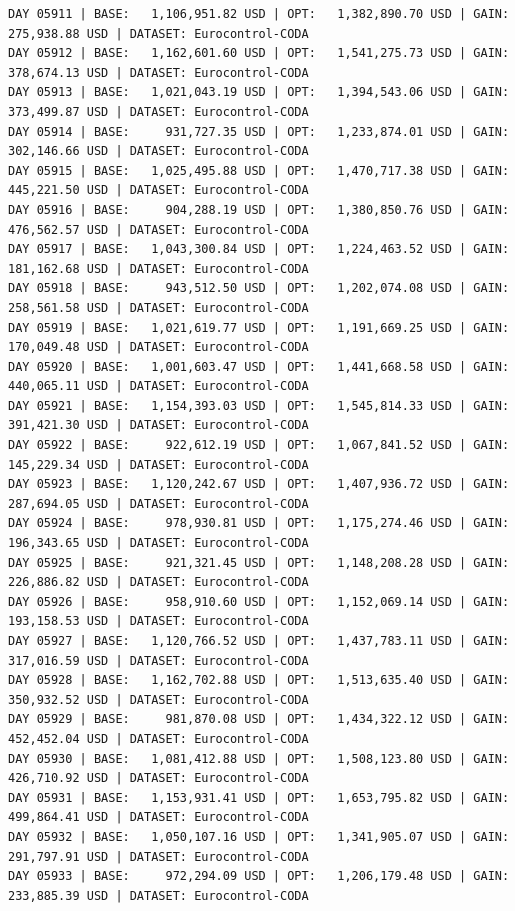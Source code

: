 \documentclass[11pt,a4paper]{article}
\begin{document}
\begin{verbatim}
DAY 05911 | BASE:   1,106,951.82 USD | OPT:   1,382,890.70 USD | GAIN: 275,938.88 USD | DATASET: Eurocontrol-CODA
DAY 05912 | BASE:   1,162,601.60 USD | OPT:   1,541,275.73 USD | GAIN: 378,674.13 USD | DATASET: Eurocontrol-CODA
DAY 05913 | BASE:   1,021,043.19 USD | OPT:   1,394,543.06 USD | GAIN: 373,499.87 USD | DATASET: Eurocontrol-CODA
DAY 05914 | BASE:     931,727.35 USD | OPT:   1,233,874.01 USD | GAIN: 302,146.66 USD | DATASET: Eurocontrol-CODA
DAY 05915 | BASE:   1,025,495.88 USD | OPT:   1,470,717.38 USD | GAIN: 445,221.50 USD | DATASET: Eurocontrol-CODA
DAY 05916 | BASE:     904,288.19 USD | OPT:   1,380,850.76 USD | GAIN: 476,562.57 USD | DATASET: Eurocontrol-CODA
DAY 05917 | BASE:   1,043,300.84 USD | OPT:   1,224,463.52 USD | GAIN: 181,162.68 USD | DATASET: Eurocontrol-CODA
DAY 05918 | BASE:     943,512.50 USD | OPT:   1,202,074.08 USD | GAIN: 258,561.58 USD | DATASET: Eurocontrol-CODA
DAY 05919 | BASE:   1,021,619.77 USD | OPT:   1,191,669.25 USD | GAIN: 170,049.48 USD | DATASET: Eurocontrol-CODA
DAY 05920 | BASE:   1,001,603.47 USD | OPT:   1,441,668.58 USD | GAIN: 440,065.11 USD | DATASET: Eurocontrol-CODA
DAY 05921 | BASE:   1,154,393.03 USD | OPT:   1,545,814.33 USD | GAIN: 391,421.30 USD | DATASET: Eurocontrol-CODA
DAY 05922 | BASE:     922,612.19 USD | OPT:   1,067,841.52 USD | GAIN: 145,229.34 USD | DATASET: Eurocontrol-CODA
DAY 05923 | BASE:   1,120,242.67 USD | OPT:   1,407,936.72 USD | GAIN: 287,694.05 USD | DATASET: Eurocontrol-CODA
DAY 05924 | BASE:     978,930.81 USD | OPT:   1,175,274.46 USD | GAIN: 196,343.65 USD | DATASET: Eurocontrol-CODA
DAY 05925 | BASE:     921,321.45 USD | OPT:   1,148,208.28 USD | GAIN: 226,886.82 USD | DATASET: Eurocontrol-CODA
DAY 05926 | BASE:     958,910.60 USD | OPT:   1,152,069.14 USD | GAIN: 193,158.53 USD | DATASET: Eurocontrol-CODA
DAY 05927 | BASE:   1,120,766.52 USD | OPT:   1,437,783.11 USD | GAIN: 317,016.59 USD | DATASET: Eurocontrol-CODA
DAY 05928 | BASE:   1,162,702.88 USD | OPT:   1,513,635.40 USD | GAIN: 350,932.52 USD | DATASET: Eurocontrol-CODA
DAY 05929 | BASE:     981,870.08 USD | OPT:   1,434,322.12 USD | GAIN: 452,452.04 USD | DATASET: Eurocontrol-CODA
DAY 05930 | BASE:   1,081,412.88 USD | OPT:   1,508,123.80 USD | GAIN: 426,710.92 USD | DATASET: Eurocontrol-CODA
DAY 05931 | BASE:   1,153,931.41 USD | OPT:   1,653,795.82 USD | GAIN: 499,864.41 USD | DATASET: Eurocontrol-CODA
DAY 05932 | BASE:   1,050,107.16 USD | OPT:   1,341,905.07 USD | GAIN: 291,797.91 USD | DATASET: Eurocontrol-CODA
DAY 05933 | BASE:     972,294.09 USD | OPT:   1,206,179.48 USD | GAIN: 233,885.39 USD | DATASET: Eurocontrol-CODA

\end{verbatim}
\end{document}
